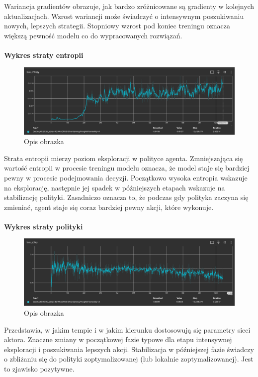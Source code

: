 \documentclass[a4paper, 12pt]{article}
\numberwithin{equation}{section}
\begin{document}
    Wariancja gradientów obrazuje, jak bardzo zróżnicowane są gradienty w kolejnych aktualizacjach. Wzrost wariancji może świadczyć o intensywnym poszukiwaniu nowych, lepszych strategii. Stopniowy wzrost pod koniec treningu oznacza większą pewność modelu co do wypracowanych rozwiązań.
    \\ \\ 
    \textbf{Wykres straty entropii}
    \begin{figure}[H]
        \centering
        \includegraphics[width=\textwidth]{pictures/A2C_loss_entropy.png}
        \caption{Opis obrazka}
    \end{figure}
    Strata entropii mierzy poziom eksploracji w polityce agenta.
    Zmniejszająca się wartość entropii w procesie treningu modelu
    oznacza, że model staje się bardziej pewny w procesie podejmowania decyzji. Początkowo wysoka entropia wskazuje na eksplorację,
    następnie jej spadek w późniejszych etapach wskazuje na stabilizację polityki.
    Zasadniczo oznacza to, że podczas gdy polityka zaczyna się zmieniać, agent staje się coraz bardziej pewny akcji, które wykonuje.
    \\ \\ 
    \textbf{Wykres straty polityki}
    \begin{figure}[H]
        \centering
        \includegraphics[width=\textwidth]{pictures/A2C_loss_policy.png}
        \caption{Opis obrazka}
    \end{figure}
    Przedstawia, w jakim tempie i w jakim kierunku dostosowują się parametry sieci aktora. 
    Znaczne zmiany w początkowej fazie typowe dla etapu intensywnej eksploracji i poszukiwania lepszych akcji.
    Stabilizacja w późniejszej fazie świadczy o zbliżaniu się do polityki zoptymalizowanej (lub lokalnie zoptymalizowanej). Jest to zjawisko pozytywne.
\end{document}

